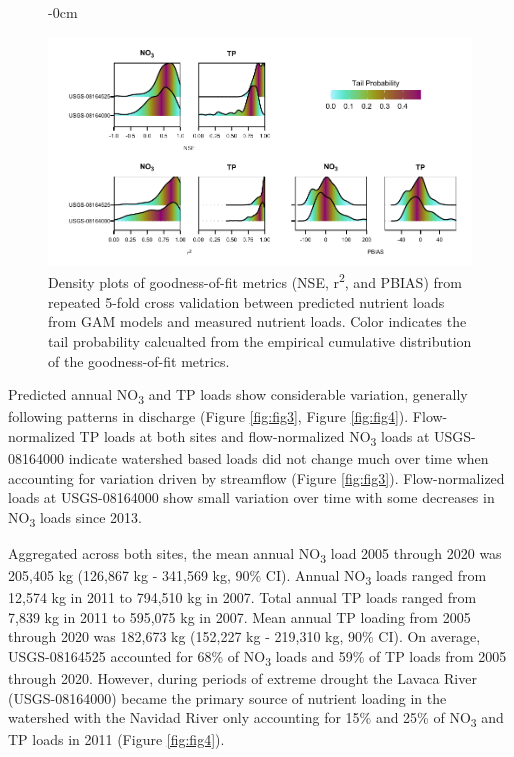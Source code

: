 \documentclass[water,article,submit,oneauthor]{Definitions/mdpi}
\begin{document}
\begin{figure}\begin{adjustwidth}{-\extralength}{0cm}

{\centering \includegraphics[width=1\linewidth]{Schramm-Manuscript-2023_files/figure-latex/fig2-1} 

}

\end{adjustwidth}\caption[Density plots of goodness-of-fit metrics (NSE, r\textsuperscript{2}, and PBIAS) from repeated 5-fold cross validation between predicted nutrient loads from GAM models and measured nutrient loads]{Density plots of goodness-of-fit metrics (NSE, r\textsuperscript{2}, and PBIAS) from repeated 5-fold cross validation between predicted nutrient loads from GAM models and measured nutrient loads. Color indicates the tail probability calcualted from the empirical cumulative distribution of the goodness-of-fit metrics.}\label{fig:fig2}
\end{figure}

Predicted annual NO\textsubscript{3} and TP loads show considerable
variation, generally following patterns in discharge (Figure
\ref{fig:fig3}, Figure \ref{fig:fig4}). Flow-normalized TP loads at both
sites and flow-normalized NO\textsubscript{3} loads at USGS-08164000
indicate watershed based loads did not change much over time when
accounting for variation driven by streamflow (Figure \ref{fig:fig3}).
Flow-normalized loads at USGS-08164000 show small variation over time
with some decreases in NO\textsubscript{3} loads since 2013.

Aggregated across both sites, the mean annual NO\textsubscript{3} load
2005 through 2020 was 205,405 kg (126,867 kg - 341,569 kg, 90\% CI).
Annual NO\textsubscript{3} loads ranged from 12,574 kg in 2011 to
794,510 kg in 2007. Total annual TP loads ranged from 7,839 kg in 2011
to 595,075 kg in 2007. Mean annual TP loading from 2005 through 2020 was
182,673 kg (152,227 kg - 219,310 kg, 90\% CI). On average, USGS-08164525
accounted for 68\% of NO\textsubscript{3} loads and 59\% of TP loads
from 2005 through 2020. However, during periods of extreme drought the
Lavaca River (USGS-08164000) became the primary source of nutrient
loading in the watershed with the Navidad River only accounting for 15\%
and 25\% of NO\textsubscript{3} and TP loads in 2011 (Figure
\ref{fig:fig4}).
\end{document}
